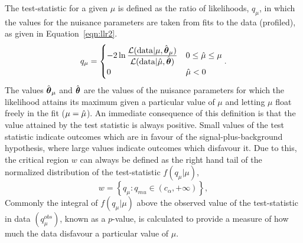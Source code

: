 The test-statistic for a given $\mu$ is defined as the ratio 
of likelihoods, $q_{\mu}$, in which the values for the nuisance parameters are taken from fits to the data (profiled), 
as given in Equation~\ref{eqn:llr2}. 
\begin{equation}
q_{\mu} = 
	\begin {cases} 
	-2\ln\frac{\displaystyle \mathcal{L}(\mathrm{data} | \mu,\hat{{\boldsymbol{\theta}}}_{\mu})}
	{\displaystyle \mathcal{L}(\mathrm{data} | \hat{\mu},\hat{{\boldsymbol{\theta}}})} 
		&  0 \le \hat{\mu} \le \mu \\
	 0 	&  \hat{\mu} < 0
	\end{cases}.
\label{eqn:llr2}
\end{equation}
The values $\hat{{\boldsymbol{\theta}}}_{\mu}$ and $\hat{{\boldsymbol{\theta}}}$ are the values of 
the nuisance parameters for which the likelihood attains its maximum 
given a particular value of $\mu$ and letting $\mu$ float freely in the 
fit ($\mu=\hat{\mu}$).
An immediate consequence of this definition is that the value attained
by the test statistic is always positive. Small values of the test
statistic indicate outcomes which are in favour of the signal-plus-background 
hypothesis, where large values indicate outcomes which disfavour it.
Due to this, the critical region $w$ can always be defined as the right
hand tail of the normalized distribution of the test-statistic $f(q_{\mu}|\mu)$, 
\begin{equation}
w = \left\{ q_{\mu} : q_{mu} \in (c_{\alpha},+\infty) \right\},
\end{equation}
Commonly the integral of $f(q_{\mu}|\mu)$ above the observed value of the 
test-statistic in data $(q_{\mu}^{obs})$, known as a $p$-value, is calculated
to provide a measure of how much the data disfavour a particular value of $\mu$. 

